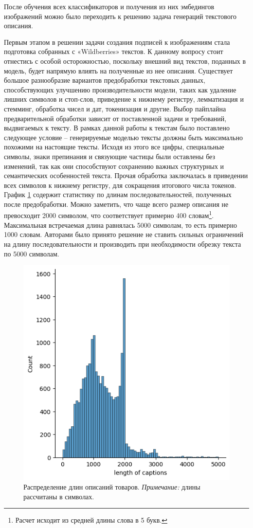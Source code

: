 \documentclass[a4paper,12pt]{extarticle}
\begin{document}
После обучения всех классификаторов и получения из них эмбедингов изображений можно было переходить к решению задача генераций текстового описания. 

Первым этапом в решении задачи создания подписей к изображениям стала подготовка собранных с «Wildberries» текстов. К данному вопросу стоит отнестись с особой осторожностью, поскольку внешний вид текстов, поданных в модель, будет напрямую влиять на полученные из нее описания. Существует большое разнообразие вариантов предобработки текстовых данных, способствующих улучшению производительности модели, таких как удаление лишних символов и стоп-слов, приведение к нижнему регистру, лемматизация и стемминг, обработка чисел и дат, токенизация и другие. Выбор пайплайна предварительной обработки зависит от поставленной задачи и требований, выдвигаемых к тексту. В рамках данной работы к текстам было поставлено следующее условие – генерируемые моделью тексты должны быть максимально похожими на настоящие тексты. Исходя из этого все цифры, специальные символы, знаки препинания и связующие частицы были оставлены без изменений, так как они способствуют сохранению важных структурных и семантических особенностей текста. Прочая обработка заключалась в приведении всех символов к нижнему регистру, для сокращения итогового числа токенов. График \ref{fig:captions_length} содержит статистику по длинам последовательностей, полученных после предобработки. Можно заметить, что чаще всего размер описания не превосходит 2000 символом, что соответствует примерно 400 словам\footnote{Расчет исходит из средней длины слова в 5 букв.}. Максимальная встречаемая длина равнялась 5000 символам, то есть примерно 1000 словам. Авторами было принято решение не ставить сильных ограничений на длину последовательности и производить при необходимости обрезку текста по 5000 символам.
\begin{figure}[ht]
	\centering
	\includegraphics[scale=0.7]{captions_length.png}
	\caption{Распределение длин описаний товаров. \textsl{Примечание:} длины рассчитаны в символах.}
	\label{fig:captions_length}
\end{figure}
\end{document}
